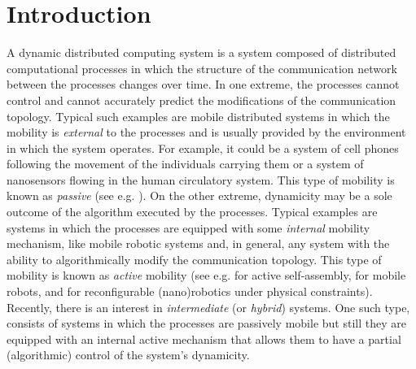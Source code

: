 \documentclass[preprint]{elsarticle}
\begin{document}
\section{Introduction}
\label{sec:intro}

A dynamic distributed computing system is a system composed of distributed computational processes in which the structure of the communication network between the processes changes over time. In one extreme, the processes cannot control and cannot accurately predict the modifications of the communication topology. Typical such examples are mobile distributed systems in which the mobility is \emph{external} to the processes and is usually provided by the environment in which the system operates. For example, it could be a system of cell phones following the movement of the individuals carrying them or a system of nanosensors flowing in the human circulatory system. This type of mobility is known as \emph{passive} (see e.g. \cite{AADFP06}). On the other extreme, dynamicity may be a sole outcome of the algorithm executed by the processes. Typical examples are systems in which the processes are equipped with some \emph{internal} mobility mechanism, like mobile robotic systems and, in general, any system with the ability to algorithmically modify the communication topology. This type of mobility is known as \emph{active} mobility (see e.g. \cite{WCG13} for active self-assembly, \cite{SY99,DFSY15,CKLL09} for mobile robots, and \cite{ACD11} for reconfigurable (nano)robotics under physical constraints). Recently, there is an interest in \emph{intermediate} (or \emph{hybrid}) systems. One such type, consists of systems in which the processes are passively mobile but still they are equipped with an internal active mechanism that allows them to have a partial (algorithmic) control of the system's dynamicity.
\end{document}
